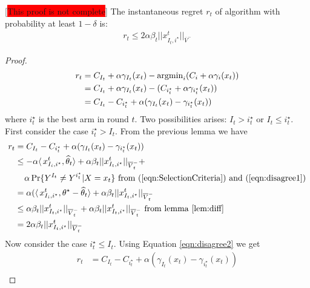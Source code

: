 \begin{thm}
	\label{thm:ir}[\colorbox{red}{This proof is not complete}]
	The instantaneous regret $r_t$ of algorithm with probability at least $1-\delta$ is:
	\begin{align*}
	r_t \le 2\alpha \beta_t ||x_{I_t, i^\star}^t||_{\overline{V}^-}
	\end{align*}
\end{thm}
\begin{proof}
	\begin{align*}
	r_t &= C_{I_t} + \alpha\gamma_{I_t}(x_t) - \operatorname{argmin}_i(C_i + \alpha\gamma_i(x_t)) \\
	&= C_{I_t} + \alpha\gamma_{I_t}(x_t) - (C_{i^\star_t} + \alpha\gamma_{i^\star_t}(x_t)) \\
	&= C_{I_t} - C_{i^\star_t} + \alpha(\gamma_{I_t}(x_t) - \gamma_{i^\star_t}(x_t)) \\
	\end{align*}
where $i_t^\star$ is the best arm in round $t$. Two possibilities arises: $I_t > i_t^\star$ or $I_t \leq i_t^\star$. First consider the case $i^\star_t > I_t$. From the previous lemma we have
	\begin{align*}
	r_t &= C_{I_t} - C_{i^\star_t} + \alpha(\gamma_{I_t}(x_t) - \gamma_{i^\star_t}(x_t)) \\
	&\le  -\alpha\langle\,x_{I_i,i^\star}^t,\widehat{\theta}_t\rangle + \alpha \beta_t||x_{I_t, i^\star}^t||_{\overline{V}^-_t}  + \\
	& \;\;\;\; \alpha \Pr\{Y^{I_t}\neq Y^{i^\star_t}|X=x_t\} \mbox{     from (\ref{eqn:SelectionCriteria}) and (\ref{eqn:disagree1})}\\ 
	&= \alpha(\langle\,x_{I_i,i^\star}^t, \theta^\star-\widehat{\theta}_t\rangle  + \alpha \beta_t||x_{I_t, i^\star}^t||_{\overline{V}^-_t} \\
	&\le \alpha \beta_t||x_{I_t, i^\star}^t||_{\overline{V}^-_t} + \alpha \beta_t||x_{I_t, i^\star}^t||_{\overline{V}^-_t} \text{ from lemma~\ref{lem:diff}}\\
	&= 2\alpha \beta_t||x_{I_t, i^\star}^t||_{\overline{V}^-_t}
	\end{align*}
Now consider the case 	$i^\star_t \leq I_t$. Using Equation \ref{eqn:disagree2} we get
\begin{align*}
r_t &= C_{I_t} - C_{i^\star_t} + \alpha(\gamma_{I_t}(x_t) - \gamma_{i^\star_t}(x_t)) \\

\end{align*}
\end{proof}

